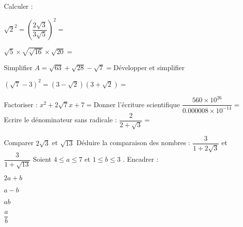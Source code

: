 \documentclass[a4paper,addpoints,12pt]{exam}
\begin{document}
\examen[Janvier 2023]

\begin{exo}[7]
\begin{questions}
\question[2]Calculer :\droppoints
\begin{multicols}{2}
$\sqrt{2}^{2}=$\anserline[1]
$\left(\dfrac{2\sqrt{3}}{3\sqrt{5}}\right)^{2}=$\anserline[2]\columnbreak

$\sqrt{5}\times \sqrt{\sqrt{16}}\times\sqrt{20}=$\anserline[3]
\end{multicols}
\question[1]Simplifier \droppoints
$A=\sqrt{63}+\sqrt{28}-\sqrt{7}=$\anserline[3]
\question[1]Développer et simplifier\droppoints
\begin{multicols}{2}
$\left(\sqrt{7}-3\right)^{2}=$\anserline[2]
$\left(3-\sqrt{2}\right)\left(3+\sqrt{2}\right)=$\anserline[2]
\end{multicols}
\question[1]Factoriser :\droppoints
$x^{2}+2\sqrt{7}x+7=$\anserline[2]
\question[1]Donner l'écriture scientifique\droppoints
$\dfrac{560\times 10^{26}}{0.000008\times 10^{-14}}=$\anserline[3]
\question[1]Ecrire le dénominateur sans radicale :\droppoints
$\dfrac{2}{2+\sqrt{3}}=$\anserline[1]
\end{questions}
\end{exo}

\begin{exo}[4]
\begin{questions}
\question[1]Comparer $2\sqrt{3}$ et $\sqrt{13}$\droppoints
\anserline[2]
\question[1]Déduire la comparaison des nombres : 
$\dfrac{3}{1+2\sqrt{3}}$ et $\dfrac{3}{1+\sqrt{13}}$\droppoints
\anserline[4]
\question[2]Soient $4\leq a\leq 7$ et $1\leq b\leq 3$ . Encadrer :\droppoints
\begin{multicols}{4}
$2a+b$\columnbreak

$a-b$\columnbreak
 
$ab$\columnbreak
  
$\dfrac{a}{b}$ 
\end{multicols}
\end{questions}
\end{exo}
\end{document}
